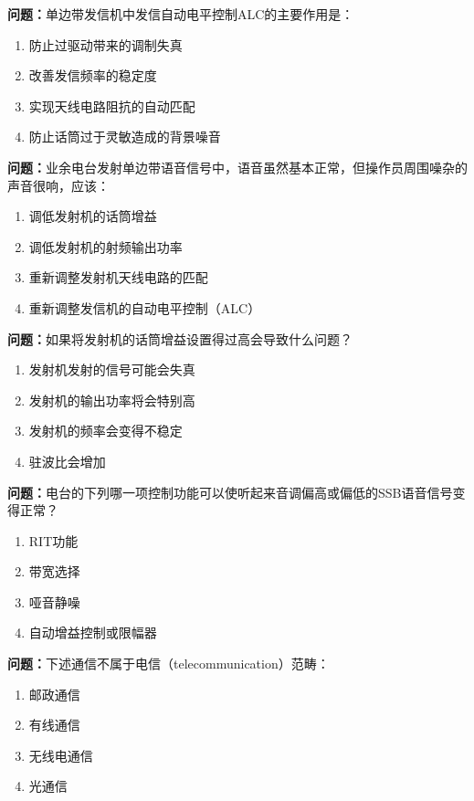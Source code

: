 \bigskip


\noindent\textbf{问题：}单边带发信机中发信自动电平控制ALC的主要作用是：
\begin{enumerate}[label=\Alph*), leftmargin=3em]
\item 防止过驱动带来的调制失真
\item 改善发信频率的稳定度
\item 实现天线电路阻抗的自动匹配
\item 防止话筒过于灵敏造成的背景噪音
\end{enumerate}

\bigskip


\noindent\textbf{问题：}业余电台发射单边带语音信号中，语音虽然基本正常，但操作员周围噪杂的声音很响，应该：
\begin{enumerate}[label=\Alph*), leftmargin=3em]
\item 调低发射机的话筒增益
\item 调低发射机的射频输出功率
\item 重新调整发射机天线电路的匹配
\item 重新调整发信机的自动电平控制（ALC）
\end{enumerate}

\bigskip


\noindent\textbf{问题：}如果将发射机的话筒增益设置得过高会导致什么问题？
\begin{enumerate}[label=\Alph*), leftmargin=3em]
\item 发射机发射的信号可能会失真
\item 发射机的输出功率将会特别高
\item 发射机的频率会变得不稳定
\item 驻波比会增加
\end{enumerate}

\bigskip


\noindent\textbf{问题：}电台的下列哪一项控制功能可以使听起来音调偏高或偏低的SSB语音信号变得正常？
\begin{enumerate}[label=\Alph*), leftmargin=3em]
\item RIT功能
\item 带宽选择
\item 哑音静噪
\item 自动增益控制或限幅器
\end{enumerate}

\bigskip


\noindent\textbf{问题：}下述通信不属于电信（telecommunication）范畴：
\begin{enumerate}[label=\Alph*), leftmargin=3em]
\item 邮政通信
\item 有线通信
\item 无线电通信
\item 光通信
\end{enumerate}

